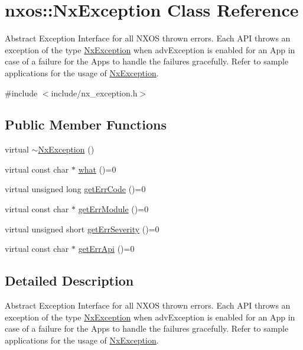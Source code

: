 \hypertarget{classnxos_1_1_nx_exception}{}\section{nxos\+:\+:Nx\+Exception Class Reference}
\label{classnxos_1_1_nx_exception}


Abstract Exception Interface for all N\+X\+OS thrown errors. Each A\+PI throws an exception of the type \mbox{\hyperlink{classnxos_1_1_nx_exception}{Nx\+Exception}} when adv\+Exception is enabled for an App in case of a failure for the Apps to handle the failures gracefully. Refer to sample applications for the usage of \mbox{\hyperlink{classnxos_1_1_nx_exception}{Nx\+Exception}}.  




{\ttfamily \#include $<$include/nx\+\_\+exception.\+h$>$}

\subsection*{Public Member Functions}
\begin{DoxyCompactItemize}
\item 
virtual \mbox{\hyperlink{classnxos_1_1_nx_exception_a2063f2937b4fdfe7a2e58f0ce727d70c}{$\sim$\+Nx\+Exception}} ()
\item 
virtual const char $\ast$ \mbox{\hyperlink{classnxos_1_1_nx_exception_ad475b90fb193848245b9537524439943}{what}} ()=0
\item 
virtual unsigned long \mbox{\hyperlink{classnxos_1_1_nx_exception_ace42c480c5b1efc0779028339a09f067}{get\+Err\+Code}} ()=0
\item 
virtual const char $\ast$ \mbox{\hyperlink{classnxos_1_1_nx_exception_ad428a765217581f320af95386350ef30}{get\+Err\+Module}} ()=0
\item 
virtual unsigned short \mbox{\hyperlink{classnxos_1_1_nx_exception_a7b5ffd11c04e3955d874ea7a6b18063f}{get\+Err\+Severity}} ()=0
\item 
virtual const char $\ast$ \mbox{\hyperlink{classnxos_1_1_nx_exception_a82ce0a75c61b55ca191c86e5abfeaa20}{get\+Err\+Api}} ()=0
\end{DoxyCompactItemize}


\subsection{Detailed Description}
Abstract Exception Interface for all N\+X\+OS thrown errors. Each A\+PI throws an exception of the type \mbox{\hyperlink{classnxos_1_1_nx_exception}{Nx\+Exception}} when adv\+Exception is enabled for an App in case of a failure for the Apps to handle the failures gracefully. Refer to sample applications for the usage of \mbox{\hyperlink{classnxos_1_1_nx_exception}{Nx\+Exception}}. 

